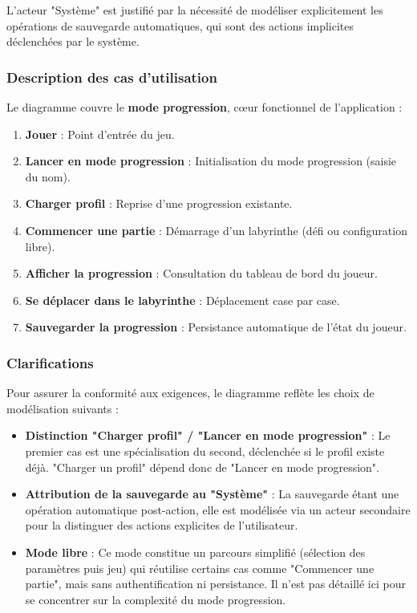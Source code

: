 \documentclass{butexFR}
\begin{document}
L'acteur "Système" est justifié par la nécessité de modéliser explicitement les opérations de sauvegarde automatiques, qui sont des actions implicites déclenchées par le système.

\subsubsection{Description des cas d'utilisation}

Le diagramme couvre le \textbf{mode progression}, cœur fonctionnel de l'application :

\begin{enumerate}
    \item \textbf{Jouer} : Point d'entrée du jeu.
    \item \textbf{Lancer en mode progression} : Initialisation du mode progression (saisie du nom).
    \item \textbf{Charger profil} : Reprise d'une progression existante.
    \item \textbf{Commencer une partie} : Démarrage d'un labyrinthe (défi ou configuration libre).
    \item \textbf{Afficher la progression} : Consultation du tableau de bord du joueur.
    \item \textbf{Se déplacer dans le labyrinthe} : Déplacement case par case.
    \item \textbf{Sauvegarder la progression} : Persistance automatique de l'état du joueur.
\end{enumerate}

\subsubsection{Clarifications}

Pour assurer la conformité aux exigences, le diagramme reflète les choix de modélisation suivants :

\begin{itemize}
    \item \textbf{Distinction "Charger profil" / "Lancer en mode progression"} : Le premier cas est une spécialisation du second, déclenchée si le profil existe déjà. "Charger un profil" dépend donc de "Lancer en mode progression".

    \item \textbf{Attribution de la sauvegarde au "Système"} : La sauvegarde étant une opération automatique post-action, elle est modélisée via un acteur secondaire pour la distinguer des actions explicites de l'utilisateur.

    \item \textbf{Mode libre} : Ce mode constitue un parcours simplifié (sélection des paramètres puis jeu) qui réutilise certains cas comme "Commencer une partie", mais sans authentification ni persistance. Il n'est pas détaillé ici pour se concentrer sur la complexité du mode progression.
\end{itemize}
\end{document}
